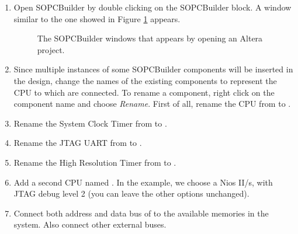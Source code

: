 \begin{enumerate}
\item Open SOPCBuilder by double clicking on the SOPCBuilder block. A
  window similar to the one showed in Figure
  \ref{fig:tutorial_sopcbuilder_standard} appears.
%
\begin{figure}

\caption{\label{fig:tutorial_sopcbuilder_standard}The SOPCBuilder
windows that appears by opening an Altera project.}
\end{figure}


\item Since multiple instances of some SOPCBuilder components will be
  inserted in the design, change the names of the existing components
  to represent the CPU to which are connected. To rename a component,
  right click on the component name and choose {\em Rename}. First of
  all, rename the CPU from  to .

\item Rename the System Clock Timer from 
  to .

\item Rename the JTAG UART from  to
  .

\item Rename the High Resolution Timer from  to
  .

\item Add a second CPU named . In the example, we choose
  a Nios II/s, with JTAG debug level 2 (you can leave the other
  options unchanged).

\item Connect both address and data bus of  to the
  available memories in the system. Also connect other external buses.


\end{enumerate}
